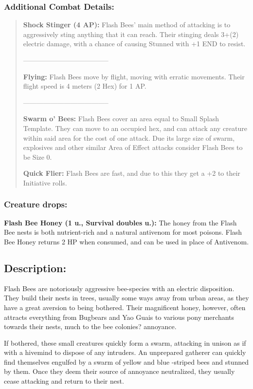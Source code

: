 \documentclass[11pt,a4paper,twocolumn]{book}
\begin{document}
	\subsubsection*{Additional Combat Details:}
	\begin{verse}
		\textbf{Shock Stinger (4 AP):} Flash Bees' main method of attacking is to aggressively sting anything that it can reach. Their stinging deals 3+(2) electric damage, with a chance of causing Stunned with +1 END to resist.
		
		--------------------------------------
		
		\textbf{Flying:} Flash Bees move by flight, moving with erratic movements. Their flight speed is 4 meters (2 Hex) for 1 AP.
		
		--------------------------------------
		
		\textbf{Swarm o' Bees:} Flash Bees cover an area equal to Small Splash Template. They can move to an occupied hex, and can attack any creature within said area for the cost of one attack. Due its large size of swarm, explosives and other similar Area of Effect attacks consider Flash Bees to be Size 0.
		
		\textbf{Quick Flier:} Flash Bees are fast, and due to this they get a +2 to their Initiative rolls.		

	\end{verse}
	
	\subsubsection*{Creature drops:}
	\textbf{Flash Bee Honey (1 u., Survival doubles u.):} The honey from the Flash Bee nests is both nutrient-rich and a natural antivenom for most poisons. Flash Bee Honey returns 2 HP when consumed, and can be used in place of Antivenom.
	
	\subsection*{Description:}
	Flash Bees are notoriously aggressive bee-species with an electric disposition. They build their nests in trees, usually some ways away from urban areas, as they have a great aversion to being bothered. Their magnificent honey, however, often attracts everything from Bugbears and Yao Guais to various pony merchants towards their nests, much to the bee colonies? annoyance.
	
	If bothered, these small creatures quickly form a swarm, attacking in unison as if with a hivemind to dispose of any intruders. An unprepared gatherer can quickly find themselves engulfed by a swarm of yellow and blue -striped bees and stunned by them. Once they deem their source of annoyance neutralized, they usually cease attacking and return to their nest.		
	\clearpage
	
\end{document}
